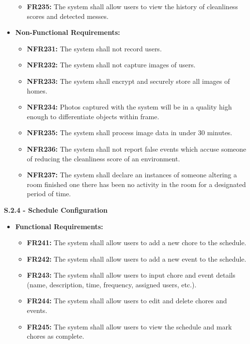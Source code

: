\documentclass{scrreprt}
\theoremstyle{definition}
\begin{document}
\begin{flushleft}
\begin{itemize}
\begin{itemize}
            \item \textbf{FR235:} The system shall allow users to view the history of cleanliness scores and detected messes.
        \end{itemize}
        \item \textbf{Non-Functional Requirements:}
        \begin{itemize}
            \item \textbf{NFR231:} The system shall not record users.
            \item \textbf{NFR232:} The system shall not capture images of users.
            \item \textbf{NFR233:} The system shall encrypt and securely store all images of homes.
            \item \textbf{NFR234:} Photos captured with the system will be in a quality high enough to differentiate objects within frame.
            \item \textbf{NFR235:} The system shall process image data in under 30 minutes.
            \item \textbf{NFR236:} The system shall not report false events which accuse someone of reducing the cleanliness score of an environment.
            \item \textbf{NFR237:} The system shall declare an instances of someone altering a room finished one there has been no activity in the room for a designated period of time.
  		\end{itemize}
  	\end{itemize}
  	\item \textbf{S.2.4 - Schedule Configuration}
  	\begin{itemize}
  		\item \textbf{Functional Requirements:}
  		\begin{itemize}
  			\item \textbf{FR241:} The system shall allow users to add a new chore to the schedule.
            \item \textbf{FR242:} The system shall allow users to add a new event to the schedule.
            \item \textbf{FR243:} The system shall allow users to input chore and event details (name, description, time, frequency, assigned users, etc.).
            \item \textbf{FR244:} The system shall allow users to edit and delete chores and events.
            \item \textbf{FR245:} The system shall allow users to view the schedule and mark chores as complete.

\end{itemize}
\end{itemize}
\end{flushleft}
\end{document}
